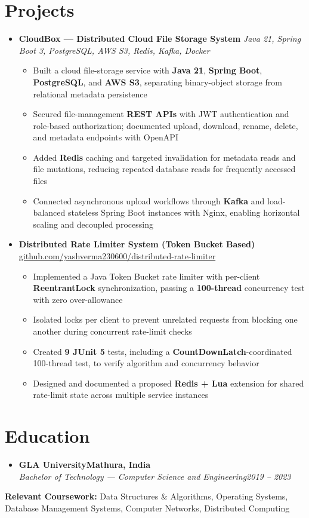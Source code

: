 \documentclass[letterpaper,11pt]{article}
\newcommand{\resumeItem}[1]{
  \item\small{{#1 \vspace{-2pt}}}
}
\newcommand{\resumeSubheading}[4]{
  \vspace{-2pt}\item
    \textbf{#1}\hfill \textbf{\small #2} \\
    \textit{\small #3}\hfill \textit{\small #4}\vspace{-7pt}
}
\newcommand{\resumeProjectHeading}[2]{
    \item
    \small #1\hfill \textbf{\small #2}\vspace{-7pt}
}
\newcommand{\resumeSubHeadingListStart}{\begin{itemize}[leftmargin=0.0in, label={}]}
\newcommand{\resumeSubHeadingListEnd}{\end{itemize}}
\newcommand{\resumeItemListStart}{\begin{itemize}}
\newcommand{\resumeItemListEnd}{\end{itemize}\vspace{-5pt}}
\begin{document}
\section{Projects}
  \resumeSubHeadingListStart
    \resumeProjectHeading
      {\textbf{CloudBox --- Distributed Cloud File Storage System} \textbar{} \textit{\small Java 21, Spring Boot 3, PostgreSQL, AWS S3, Redis, Kafka, Docker}}{}
      \resumeItemListStart
        \resumeItem{Built a cloud file-storage service with \textbf{Java 21}, \textbf{Spring Boot}, \textbf{PostgreSQL}, and \textbf{AWS S3}, separating binary-object storage from relational metadata persistence}
        \resumeItem{Secured file-management \textbf{REST APIs} with JWT authentication and role-based authorization; documented upload, download, rename, delete, and metadata endpoints with OpenAPI}
        \resumeItem{Added \textbf{Redis} caching and targeted invalidation for metadata reads and file mutations, reducing repeated database reads for frequently accessed files}
        \resumeItem{Connected asynchronous upload workflows through \textbf{Kafka} and load-balanced stateless Spring Boot instances with Nginx, enabling horizontal scaling and decoupled processing}
      \resumeItemListEnd
    \resumeProjectHeading
      {\textbf{Distributed Rate Limiter System (Token Bucket Based)} \textbar{} \href{https://github.com/yashverma230600/distributed-rate-limiter}{github.com/yashverma230600/distributed-rate-limiter}}{}
      \resumeItemListStart
        \resumeItem{Implemented a Java Token Bucket rate limiter with per-client \textbf{ReentrantLock} synchronization, passing a \textbf{100-thread} concurrency test with zero over-allowance}
        \resumeItem{Isolated locks per client to prevent unrelated requests from blocking one another during concurrent rate-limit checks}
        \resumeItem{Created \textbf{9 JUnit 5} tests, including a \textbf{CountDownLatch}-coordinated 100-thread test, to verify algorithm and concurrency behavior}
        \resumeItem{Designed and documented a proposed \textbf{Redis + Lua} extension for shared rate-limit state across multiple service instances}
      \resumeItemListEnd
  \resumeSubHeadingListEnd
\vspace{-8pt}

\section{Education}
  \resumeSubHeadingListStart
    \resumeSubheading
      {GLA University}{Mathura, India}
      {Bachelor of Technology --- Computer Science and Engineering}{2019 -- 2023}
  \resumeSubHeadingListEnd
  \vspace{-2pt}
  \begin{itemize}[leftmargin=0.15in, label={}]
    \small{\item{
      \textbf{Relevant Coursework:} Data Structures \& Algorithms, Operating Systems, Database Management Systems, Computer Networks, Distributed Computing
    }}
  \end{itemize}
\vspace{-4pt}
\end{document}
